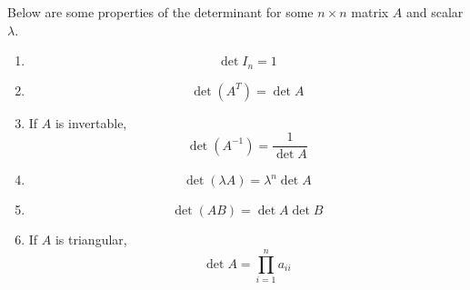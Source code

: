 \noindent
Below are some properties of the determinant for some $n \times n$ matrix $A$ and scalar $\lambda$.
\begin{enumerate}[label=]
	\item \begin{equation*}
		\det{I_n} = 1
	\end{equation*}
	\item \begin{equation*}
		\det{(A^T)} = \det{A}
	\end{equation*}
	\item If $A$ is invertable,
		\begin{equation*}
			\det{(A^{-1})} = \frac{1}{\det{A}}
		\end{equation*}
	\item \begin{equation*}
		\det{(\lambda A)} = \lambda^n\det{A}
	\end{equation*}
	\item \begin{equation*}
		\det{(AB)} = \det{A}\det{B}
	\end{equation*}
	\item If $A$ is triangular,
		\begin{equation*}
			\det{A} = \prod_{i=1}^{n}{a_{ii}}
		\end{equation*}
\end{enumerate}

\ifodd{}\fi